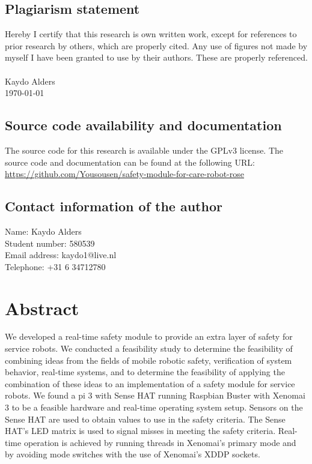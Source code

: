 \documentclass[12pt]{scrreprt}
\begin{document}
\newpage
\mbox{}
\vfill
\section*{Plagiarism statement}
Hereby I certify that this research is own written work, except for references to prior research by others, which are properly cited. Any use of figures not made by myself I have been granted to use by their authors. These are properly referenced.\\\\
Kaydo Alders\\
\today

\section*{Source code availability and documentation}
The source code for this research is available under the GPLv3 license. The source code and documentation can be found at the following URL: \href{https://github.com/Yousousen/safety-module-for-care-robot-rose}{https://github.com/Yousousen/safety-module-for-care-robot-rose}

\section*{Contact information of the author}
Name: Kaydo Alders\\
Student number: 580539\\
Email address: kaydo1@live.nl\\
Telephone: +31 6 34712780\\

\newpage
\chapter*{Abstract}

We developed a real-time safety module to provide an extra layer of safety for service robots.
We conducted a feasibility study to determine the feasibility of combining ideas from the fields of mobile robotic safety, verification of system behavior, real-time systems, and to determine the feasibility of applying the combination of these ideas to an implementation of a safety module for service robots. We found a \gls{pi} 3 with Sense HAT running Raspbian Buster with Xenomai 3 to be a feasible hardware and real-time operating system setup. Sensors on the Sense HAT are used to obtain values to use in the safety criteria. The Sense HAT's LED matrix is used to signal misses in meeting the safety criteria. Real-time operation is achieved by running threads in Xenomai's primary mode and by avoiding mode switches with the use of Xenomai's XDDP sockets.
\end{document}
